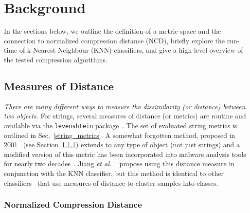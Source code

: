 \documentclass[conference]{IEEEtran}
\newcommand{\cm}[1]{\textit{{\color{blue}#1}}}
\begin{document}
\section{Background}

In the sections below, we outline the definition of a metric space and the connection to normalized compression distance (NCD), briefly explore the run-time of k-Nearest Neighbour (KNN) classifiers, and give a high-level overview of the tested compression algorithms.



\subsection{Measures of Distance}

\cm{There are many different ways to measure the dissimilarity (or distance) between two objects.}
For strings, several measures of distance (or metrics) are routine and available via the \texttt{levenshtein} package~\cite{levenshtein}. 
The set of evaluated string metrics is outlined in Sec.~\ref{string_metrics}. 
A somewhat forgotten method, proposed in 2001~\cite{ncd} (see Section~\ref{ncd}) extends to any type of object (not just strings) and a modified version of this metric has been incorporated into malware analysis tools for nearly two decades~\cite{}. 
Jiang \textit{et al.} ~\cite{jiang2022less} propose using this distance measure in conjunction with the KNN classifier, but this method is identical to other classifiers~\cite{vapnik1994measuring} that use measures of distance to cluster samples into classes. 



\subsubsection{Normalized Compression Distance}
\label{ncd}
\end{document}

